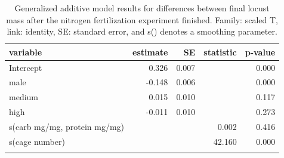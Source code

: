 \documentclass[
]{article}
\begin{document}
\endgroup

\begingroup
\fontsize{12.0pt}{14.4pt}\selectfont

\begin{longtable}{lrrrr}

\toprule
variable & estimate & SE & statistic & p-value \\ 
\midrule\addlinespace[2.5pt]
Intercept & 0.326 & 0.007 &  & 0.000 \\ 
male & -0.148 & 0.006 &  & 0.000 \\ 
medium & 0.015 & 0.010 &  & 0.117 \\ 
high & -0.011 & 0.010 &  & 0.273 \\ 
s(carb mg/mg, protein mg/mg) &  &  & 0.002 & 0.416 \\ 
s(cage number) &  &  & 42.160 & 0.000 \\ 
\bottomrule

\caption{\label{tbl-field-cage-locust-mass}Generalized additive model
results for differences between final locust mass after the nitrogen
fertilization experiment finished. Family: scaled T, link: identity, SE:
standard error, and s() denotes a smoothing parameter.}

\tabularnewline

\end{longtable}

\endgroup

\begingroup
\fontsize{12.0pt}{14.4pt}\selectfont
\end{document}

